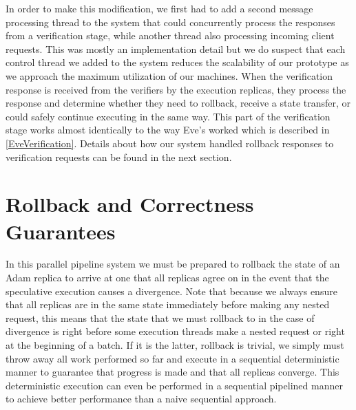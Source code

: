 \documentclass[11pt, oneside]{report}
\begin{document}
In order to make this modification, we first had to add a second message processing thread to the system that could concurrently process the responses from a verification stage, while another thread also processing incoming client requests. 
This was mostly an implementation detail but we do suspect that each control thread we added to the system reduces the scalability of our prototype as we approach the maximum utilization of our machines.
When the verification response is received from the verifiers by the execution replicas, they process the response and determine whether they need to rollback, receive a state transfer, or could safely continue executing in the same way. 
This part of the verification stage works almost identically to the way Eve's worked which is described in \ref{EveVerification}.
Details about how our system handled rollback responses to verification requests can be found in the next section.

\section{Rollback and Correctness Guarantees}

In this parallel pipeline system we must be prepared to rollback the state of an Adam replica to arrive at one that all replicas agree on in the event that the speculative execution causes a divergence. 
Note that because we always ensure that all replicas are in the same state immediately before making any nested request, this means that the state that we must rollback to in the case of divergence is right before some execution threads make a nested request or right at the beginning of a batch. 
If it is the latter, rollback is trivial, we simply must throw away all work performed so far and execute in a sequential deterministic manner to guarantee that progress is made and that all replicas converge. 
This deterministic execution can even be performed in a sequential pipelined manner to achieve better performance than a naive sequential approach.
\end{document}
